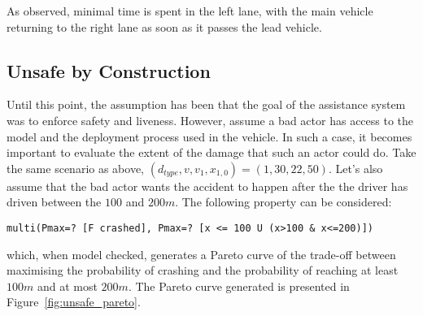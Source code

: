 As observed, minimal time is spent in the left lane, with the main vehicle returning to the right lane as soon as it passes the lead vehicle.

%
%
%

\subsection{Unsafe by Construction}

Until this point, the assumption has been that the goal of the assistance system was to enforce safety and liveness. However, assume a bad actor has access to the model and the deployment process used in the vehicle. In such a case, it becomes important to evaluate the extent of the damage that such an actor could do. Take the same scenario as above, $(d_{type}, v, v_1, x_{1,0}) = (1, 30, 22, 50)$. Let's also assume that the bad actor wants the accident to happen after the the driver has driven between the $100$ and $200m$. The following property can be considered:

\begin{minipage}{\linewidth}
{\vspace{1em}
\begin{lstlisting}
multi(Pmax=? [F crashed], Pmax=? [x <= 100 U (x>100 & x<=200)])
\end{lstlisting}
}
\end{minipage}

which, when model checked, generates a Pareto curve of the trade-off between maximising the probability of crashing and the probability of reaching at least $100m$ and at most $200m$. The Pareto curve generated is presented in Figure~\ref{fig:unsafe_pareto}.

